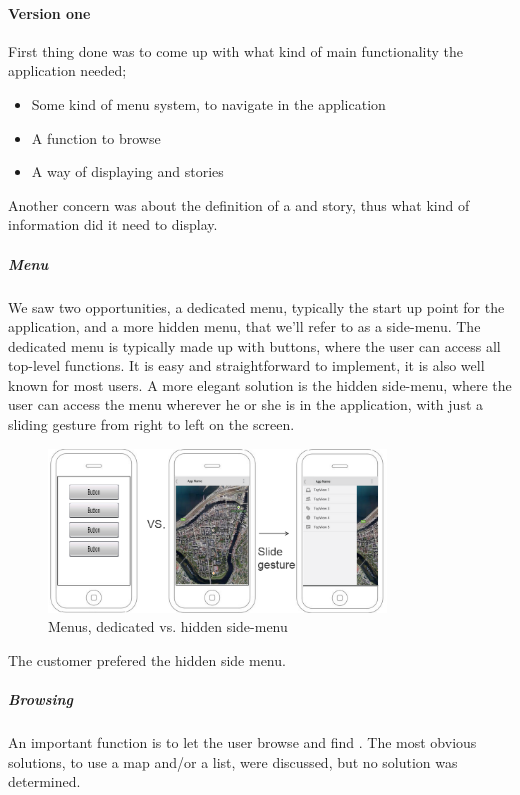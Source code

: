 \documentclass[11pt]{book}
\begin{document}
\paragraph{Version one}

First thing done was to come up with what kind of main functionality the application needed;

\begin{itemize}
    \item Some kind of menu system, to navigate in the application
    \item A function to browse \wallentityp
    \item A way of displaying \wallentityp and stories
\end{itemize}

Another concern was about the definition of a \wallentitys and story, thus what kind of information did it need to display.

\subparagraph{Menu}
We saw two opportunities, a dedicated menu, typically the start up point for the application, and a more hidden menu, that we'll refer to as a side-menu. The dedicated menu is typically made up with buttons, where the user can access all top-level functions. It is easy and straightforward to implement, it is also well known for most users. A more elegant solution is the hidden side-menu, where the user can access the menu wherever he or she is in the application, with just a sliding gesture from right to left on the screen.

\begin{figure}[H]
    \centering
    \includegraphics[width=0.8\textwidth]{Figures/Phases/Sprint1/versiononeSliding.png}
    \caption{Menus, dedicated vs. hidden side-menu}
    \label{fig:phases_sprint1_uiVersionOneMenu}
\end{figure}

The customer prefered the hidden side menu.

\subparagraph{Browsing \wallentityp}
An important function is to let the user browse and find \wallentityp. The most obvious solutions, to use a map and/or a list, were discussed, but no solution was determined. 
\end{document}
